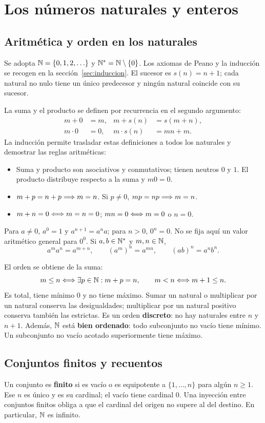 \chapter{Los números naturales y enteros}
\label{cap:naturales-enteros}

\section{Aritmética y orden en los naturales}
\label{sec:aritmetica-naturales}
Se adopta $\mathbb{N}=\{0,1,2,\ldots\}$ y $\mathbb{N}^*=\mathbb{N}\setminus\{0\}$.
Los axiomas de Peano y la inducción se recogen en la
sección~\ref{sec:induccion}. El sucesor es $s(n)=n+1$; cada natural no
nulo tiene un único predecesor y ningún natural coincide con su sucesor.

La suma y el producto se definen por recurrencia en el segundo argumento:
\begin{align*}
 m+0&=m,&m+s(n)&=s(m+n),\\
 m\cdot0&=0,&m\cdot s(n)&=mn+m.
\end{align*}
La inducción permite trasladar estas definiciones a todos los naturales
y demostrar las reglas aritméticas:
\begin{itemize}
\item Suma y producto son asociativos y conmutativos; tienen neutros
$0$ y $1$. El producto distribuye respecto a la suma y $m0=0$.
\item $m+p=n+p\Longrightarrow m=n$. Si $p\ne0$, $mp=np\Longrightarrow m=n$.
\item $m+n=0\Longleftrightarrow m=n=0$; $mn=0\Longleftrightarrow m=0$ o $n=0$.
\end{itemize}
Para $a\ne0$, $a^0=1$ y $a^{n+1}=a^na$; para $n>0$, $0^n=0$.
No se fija aquí un valor aritmético general para $0^0$.
Si $a,b\in\mathbb{N}^*$ y $m,n\in\mathbb{N}$,
\[
 a^ma^n=a^{m+n},\qquad (a^m)^n=a^{mn},\qquad (ab)^n=a^nb^n.
\]

El orden se obtiene de la suma:
\[
 m\le n\Longleftrightarrow \exists p\in\mathbb{N}: m+p=n,
 \qquad m<n\Longleftrightarrow m+1\le n.
\]
Es total, tiene mínimo $0$ y no tiene máximo. Sumar un natural o
multiplicar por un natural conserva las desigualdades; multiplicar por
un natural positivo conserva también las estrictas.
Es un orden \textbf{discreto}: no hay naturales entre $n$ y $n+1$.
Además, $\mathbb{N}$ está \textbf{bien ordenado}: todo subconjunto no vacío tiene
mínimo. Un subconjunto no vacío acotado superiormente tiene máximo.

\section{Conjuntos finitos y recuentos}
\label{sec:recuentos}
Un conjunto es \textbf{finito} si es vacío o es equipotente a
$\{1,\ldots,n\}$ para algún $n\ge1$. Ese $n$ es único y es su cardinal;
el vacío tiene cardinal $0$. Una inyección entre conjuntos finitos
obliga a que el cardinal del origen no supere al del destino.
En particular, $\mathbb{N}$ es infinito.

